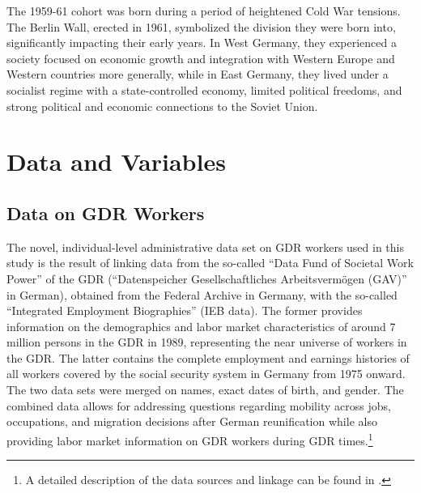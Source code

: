 \begin{Article}
\begin{refsection}[Spitz]
The 1959-61 cohort was born during a period of heightened Cold War tensions. The Berlin Wall, erected in 1961, symbolized the division they were born into, significantly impacting their early years. In West Germany, they experienced a society focused on economic growth and integration with Western Europe and Western countries more generally, while in East Germany, they lived under a socialist regime with a state-controlled economy, limited political freedoms, and strong political and economic connections to the Soviet Union. 


\section{Data and Variables}\label{data}
\subsection{Data on GDR Workers}\label{GDRdata}
The novel, individual-level administrative data set on GDR workers used in this study is the result of linking data from the so-called ``Data Fund of Societal Work Power'' of the GDR (``Datenspeicher Gesellschaftliches Arbeitsvermögen (GAV)'' in German), obtained from the Federal Archive in Germany, with the so-called ``Integrated Employment Biographies'' (IEB data). The former provides information on the demographics and labor market characteristics of around 7 million persons in the GDR in 1989, representing the near universe of workers in the GDR. The latter contains the complete employment and earnings histories of all workers covered by the social security system in Germany from 1975 onward. The two data sets were merged on names, exact dates of birth, and gender. The combined data allows for addressing questions regarding mobility across jobs, occupations, and migration decisions after German reunification while also providing labor market information on GDR workers during GDR times.\footnote{A detailed description of the data sources and linkage can be found in \parencite{LiepmannMuller2018}.} 



\end{refsection}
\end{Article}
